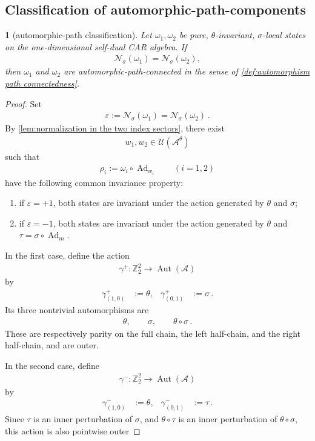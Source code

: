 \documentclass[a4paper,10pt]{article}
\numberwithin{equation}{section}
\theoremstyle{plain}
\newtheorem{thm}{\protect\theoremname}[section]
\theoremstyle{plain}
\theoremstyle{plain}
\theoremstyle{plain}
\theoremstyle{plain}
\theoremstyle{remark}
\theoremstyle{definition}
\providecommand{\theoremname}{Theorem}
\newcommand{\ZZ}{\mathbb{Z}}
\newcommand{\calA}{\mathcal{A}}
\newcommand{\calN}{\mathcal{N}}
\newcommand{\calU}{\mathcal{U}}
\newcommand{\Ad}[1]{\operatorname{Ad}_{#1}}
\newcommand{\eq}[1]{\begin{align*}#1\end{align*}}
\newcommand{\eql}[1]{\begin{align}#1\end{align}}
\begin{document}
\subsection{Classification of automorphic-path-components}

\begin{thm}[automorphic-path classification]
\label{thm:automorphism path classification}
Let \(\omega_1,\omega_2\) be pure, \(\theta\)-invariant,
\(\sigma\)-local states on the one-dimensional self-dual CAR algebra.
If
\eql{
    \calN_\sigma(\omega_1)
    =
    \calN_\sigma(\omega_2),
    \label{eq:equal sigma indices}
}
then \(\omega_1\) and \(\omega_2\) are
automorphic-path-connected in the sense of
\cref{def:automorphism path connectedness}.
\end{thm}

\begin{proof}
Set
\eq{
    \varepsilon
    :=
    \calN_\sigma(\omega_1)
    =
    \calN_\sigma(\omega_2)\,.
}
By \cref{lem:normalization in the two index sectors}, there exist
\eq{
    w_1,w_2\in\calU(\calA^\theta)
}
such that
\eq{
    \rho_i
    :=
    \omega_i\circ\Ad{w_i}
    \qquad
    (i=1,2)
}
have the following common invariance property:
\begin{enumerate}
    \item if \(\varepsilon=+1\), both states are invariant under the
    action generated by \(\theta\) and \(\sigma\);
    \item if \(\varepsilon=-1\), both states are invariant under the
    action generated by \(\theta\) and
    \(\tau=\sigma\circ\Ad{m}\).
\end{enumerate}

In the first case, define the action
\eq{
    \gamma^+:
    \ZZ_2^2
    \longrightarrow
    \operatorname{Aut}(\calA)
}
by
\eq{
    \gamma^+_{(1,0)}
    &:=
    \theta,&
    \gamma^+_{(0,1)}
    &:=
    \sigma\,.
}
Its three nontrivial automorphisms are
\eq{
    \theta,\qquad
    \sigma,\qquad
    \theta\circ\sigma\,.
}
These are respectively parity on the full chain, the left half-chain,
and the right half-chain, and are outer.

In the second case, define
\eq{
    \gamma^-:
    \ZZ_2^2
    \longrightarrow
    \operatorname{Aut}(\calA)
}
by
\eq{
    \gamma^-_{(1,0)}
    &:=
    \theta,&
    \gamma^-_{(0,1)}
    &:=
    \tau\,.
}
Since \(\tau\) is an inner perturbation of \(\sigma\), and
\(\theta\circ\tau\) is an inner perturbation of
\(\theta\circ\sigma\), this action is also pointwise outer


\end{proof}
\end{document}
